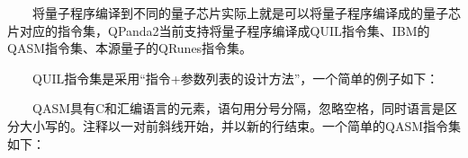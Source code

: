 \documentclass[a4paper,11pt,english]{sphinxmanual}
\begin{document}
\sphinxAtStartPar
{}

\sphinxAtStartPar
  将量子程序编译到不同的量子芯片实际上就是可以将量子程序编译成的量子芯片对应的指令集，QPanda2当前支持将量子程序编译成QUIL指令集、IBM的QASM指令集、本源量子的QRunes指令集。

\sphinxAtStartPar
  QUIL指令集是采用“指令+参数列表的设计方法”，一个简单的例子如下：

\begin{sphinxVerbatim}[commandchars=\\\{\}]
 
 
  
 
 
  \PYG{p}{[}\PYG{p}{]}
\end{sphinxVerbatim}

\sphinxAtStartPar
  QASM具有C和汇编语言的元素，语句用分号分隔，忽略空格，同时语言是区分大小写的。注释以一对前斜线开始，并以新的行结束。一个简单的QASM指令集如下：
\end{document}
